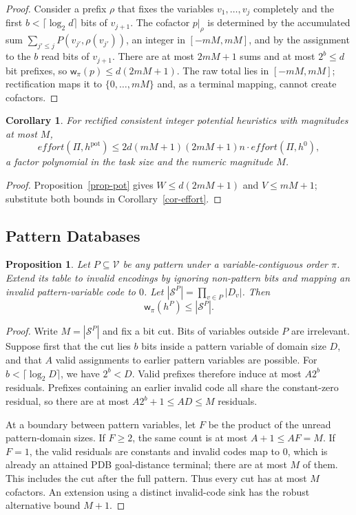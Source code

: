 \documentclass[letterpaper]{article}
\newcommand{\task}{\ensuremath{\Pi}}
\newcommand{\vars}{\ensuremath{\mathcal{V}}}
\newcommand{\states}{\ensuremath{\mathcal{S}}}
\newcommand{\hblind}{\ensuremath{h^{0}}}
\newcommand{\hpot}{\ensuremath{h^{\text{pot}}}}
\newcommand{\width}{\ensuremath{\mathsf{w}}}
\newcommand{\values}{\ensuremath{V}}
\newcommand{\effort}{\ensuremath{\mathit{effort}}}
\theoremstyle{plain}
\newtheorem{proposition}{Proposition}
\newtheorem{corollary}{Corollary}
\theoremstyle{definition}
\theoremstyle{remark}
\begin{document}
\begin{proof}
Consider a prefix $\rho$ that fixes the variables
$v_1,\dots,v_j$ completely and the first
$b<\lceil\log_2d\rceil$ bits of $v_{j+1}$. The cofactor $p|_\rho$ is
determined by the accumulated sum
$\sum_{j'\leq j}P(v_{j'},\rho(v_{j'}))$, an integer in $[-mM,mM]$,
and by the assignment to the $b$ read bits of $v_{j+1}$. There are at
most $2mM+1$ sums and at most $2^b\leq d$ bit prefixes, so
$\width_\pi(p)\leq d(2mM+1)$. The raw total lies in $[-mM,mM]$;
rectification maps it to $\{0,\dots,mM\}$ and, as a terminal mapping,
cannot create cofactors.
\end{proof}

\begin{corollary}
\label{cor-pot}
For rectified consistent integer potential heuristics with magnitudes at
most $M$,
\[
\effort(\task,\hpot)
 \leq 2d(mM+1)(2mM+1)n\cdot\effort(\task,\hblind),
\]
a factor polynomial in the task size and the numeric magnitude $M$.
\end{corollary}

\begin{proof}
Proposition~\ref{prop-pot} gives
$W\leq d(2mM+1)$ and $\values\leq mM+1$; substitute both bounds in
Corollary~\ref{cor-effort}.
\end{proof}

\subsection{Pattern Databases}

\begin{proposition}
\label{prop-pdb}
Let $P\subseteq\vars$ be any pattern under a variable-contiguous order
$\pi$. Extend its table to invalid encodings by ignoring non-pattern
bits and mapping an invalid pattern-variable code to $0$. Let
$|\states^P|=\prod_{v\in P}|D_v|$. Then
\[
\width_\pi(h^P)\leq|\states^P|.
\]
\end{proposition}

\begin{proof}
Write $M=|\states^P|$ and fix a bit cut. Bits of variables outside $P$ are
irrelevant. Suppose first that the cut lies $b$ bits inside a pattern
variable of domain size $D$, and that $A$ valid assignments to earlier
pattern variables are possible. For
$b<\lceil\log_2D\rceil$, we have $2^b<D$. Valid prefixes therefore induce
at most $A2^b$ residuals. Prefixes containing an earlier invalid code all
share the constant-zero residual, so there are at most
$A2^b+1\leq AD\leq M$ residuals.

At a boundary between pattern variables, let $F$ be the product of the
unread pattern-domain sizes. If $F\geq2$, the same count is at most
$A+1\leq AF=M$. If $F=1$, the valid residuals are constants and invalid
codes map to $0$, which is already an attained PDB goal-distance terminal;
there are at most $M$ of them. This includes the cut after the full pattern.
Thus every cut has at most $M$ cofactors. An extension using a distinct
invalid-code sink has the robust alternative bound $M+1$.
\end{proof}
\end{document}
